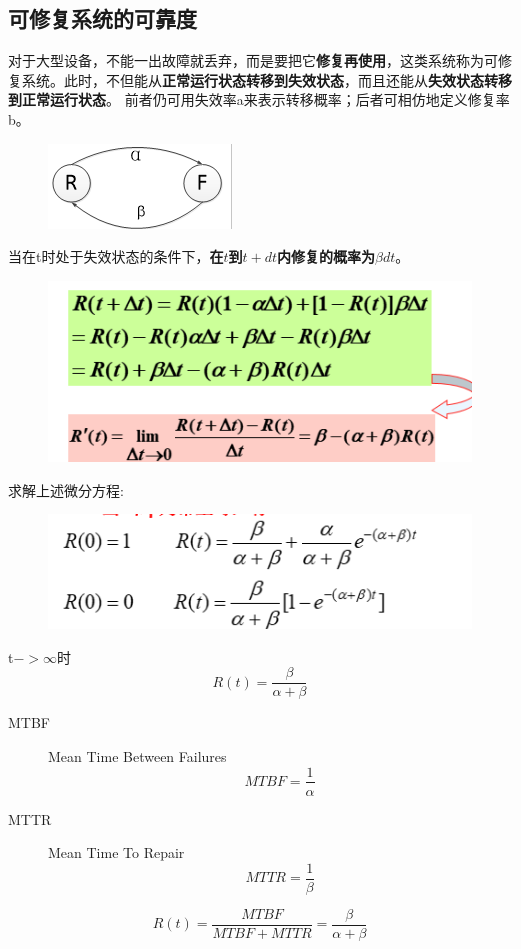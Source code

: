 \subsection{可修复系统的可靠度}
对于大型设备，不能一出故障就丢弃，而是要把它\textbf{修复再使用}，这类系统称为可修复系统。此时，不但能从\textbf{正常运行状态转移到失效状态}，而且还能从\textbf{失效状态转移到正常运行状态}。
前者仍可用失效率a来表示转移概率；后者可相仿地定义修复率b。
\begin{figure}[H]
	\centering
	\includegraphics[width=0.4\linewidth]{figures/screenshot088}
	\caption{}
	\label{fig:screenshot088}
\end{figure}
当在t时处于失效状态的条件下，\textbf{在$ t $到$ t+dt $内修复的概率为$ \beta dt $}。
\begin{figure}[H]
	\centering
	\includegraphics[width=0.7\linewidth]{figures/screenshot089}
	\caption{}
	\label{fig:screenshot089}
\end{figure}
求解上述微分方程:
\begin{figure}[H]
	\centering
	\includegraphics[width=0.7\linewidth]{figures/screenshot090}
	\caption{}
	\label{fig:screenshot090}
\end{figure}
t$ -> \infty$时
\begin{equation}\label{key}
R(t) = \frac{\beta}{\alpha+\beta}
\end{equation}
\begin{description}
	\item[MTBF] Mean Time Between Failures
	\begin{equation}\label{key}
	MTBF = \frac{1}{\alpha}
	\end{equation}
	\item[MTTR] Mean Time To Repair
	\begin{equation}\label{key}
	MTTR = \frac{1}{\beta}
	\end{equation}
\end{description}
\begin{equation}\label{key}
R(t) = \frac{MTBF}{MTBF+MTTR} = \frac{\beta}{\alpha+\beta}
\end{equation}

